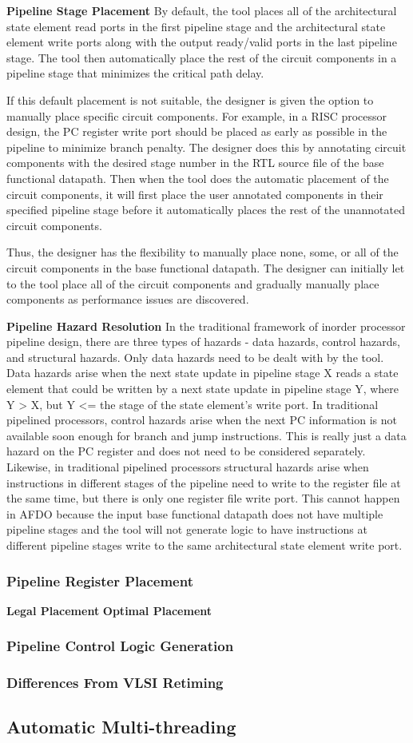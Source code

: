 {\bf Pipeline Stage Placement}
By default, the tool places all of the architectural state element read ports in the first pipeline stage and the architectural state element write ports along with the output ready/valid ports in the last pipeline stage. The tool then automatically place the rest of the circuit components in a pipeline stage that minimizes the critical path delay.

If this default placement is not suitable, the designer is given the option to manually place specific circuit components. For example, in a RISC processor design, the PC register write port should be placed as early as possible in the pipeline to minimize branch penalty. The designer does this by annotating circuit components with the desired stage number in the RTL source file of the base functional datapath. Then when the tool does the automatic placement of the circuit components, it will first place the user annotated components in their specified pipeline stage before it automatically places the rest of the unannotated circuit components. 

Thus, the designer has the flexibility to manually place none, some, or all of the circuit components in the base functional datapath. The designer can initially let to the tool place all of the circuit components and gradually manually place components as performance issues are discovered.

{\bf Pipeline Hazard Resolution}
In the traditional framework of inorder processor pipeline design, there are three types of hazards - data hazards, control hazards, and structural hazards. Only data hazards need to be dealt with by the tool. Data hazards arise when the next state update in pipeline stage X reads a state element that could be written by a next state update in pipeline stage Y, where Y > X, but Y <= the stage of the state element's write port. In traditional pipelined processors, control hazards arise when the next PC information is not available soon enough for branch and jump instructions. This is really just a data hazard on the PC register and does not need to be considered separately. Likewise, in traditional pipelined processors structural hazards arise when instructions in different stages of the pipeline need to write to the register file at the same time, but there is only one register file write port. This cannot happen in AFDO because the input base functional datapath does not have multiple pipeline stages and the tool will not generate logic to have instructions at different pipeline stages write to the same architectural state element write port.
\subsubsection{Pipeline Register Placement}
{\bf Legal Placement}
{\bf Optimal Placement}
\subsubsection{Pipeline Control Logic Generation}
\subsubsection{Differences From VLSI Retiming}
\subsection{Automatic Multi-threading}
